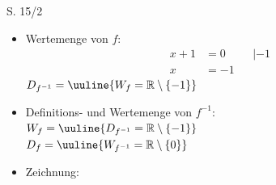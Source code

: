 \begin{Exercise}{S. 15/2}{}
\begin{enumerate}
\begin{enumerate}[label=\alph*)]
{\begin{itemize}[leftmargin=*]
{                        $\Rightarrow \quad f^{-1}(x) = \dfrac{1}{x + 1}$ \quad auf \quad $\mathbb{R} \setminus \{0\}$\\
                        }
                    \item Wertemenge von $f$: \\{
                        \vspace{-3.0ex}
                        \begin{align*}
                            x + 1 & = 0 &&| -1\\[1.0ex]
                            x &= -1 &&
                        \end{align*}
                        $D_{f^{-1}} = \uuline{W_{f} = \mathbb{R} \setminus \{-1\}}$
                        }
                    \item Definitions- und Wertemenge von $f^{-1}$:\\[2.0ex]{
                        $W_{f} = \uuline{D_{f^{-1}} = \mathbb{R} \setminus \{-1\}}$\\[1.0ex]
                        $D_{f} = \uuline{W_{f^{-1}} = \mathbb{R} \setminus \{0\}}$
                        }
                    \item Zeichnung: \\[-2.0ex]{
                        }
\end{itemize}}
\end{enumerate}
\end{enumerate}
\end{Exercise}
